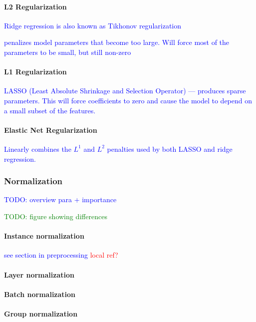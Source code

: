 \paragraph{L2 Regularization}

\textcolor{blue}{Ridge regression is also known as {Tikhonov regularization}}

\textcolor{blue}{penalizes model parameters that become too large. Will force most of the parameters to be small, but still non-zero}


\paragraph{L1 Regularization}

\textcolor{blue}{LASSO (Least Absolute Shrinkage and Selection Operator) --- produces sparse parameters. This will force coefficients to zero and cause the model to depend on a small subset of the features.}


\paragraph{Elastic Net Regularization}

\textcolor{blue}{Linearly combines the $L^1$ and $L^2$ penalties used by both LASSO and ridge regression.}



\subsubsection{Normalization}

\textcolor{blue}{TODO: overview para + importance}

\textcolor{green}{TODO: figure showing differences}

\paragraph{Instance normalization}

\textcolor{blue}{see section in preprocessing \textcolor{red}{local ref?}}

\paragraph{Layer normalization}

\paragraph{Batch normalization}

\paragraph{Group normalization}